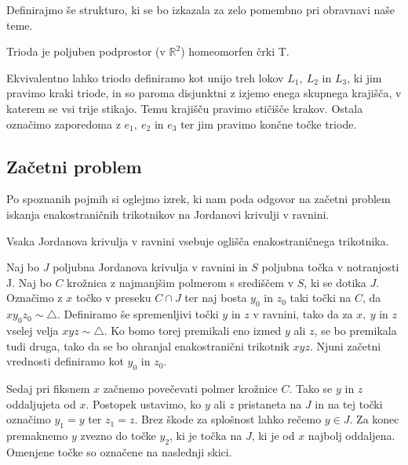 \documentclass[mat1]{fmfdelo}
\newcommand{\R}{\mathbb R}
\begin{document}
Definirajmo še strukturo, ki se bo izkazala za zelo pomembno pri obravnavi naše teme.
\begin{definicija}
Trioda je poljuben podprostor (v $\R^2$) homeomorfen črki T.
\end{definicija}
Ekvivalentno lahko triodo definiramo kot unijo treh lokov $L_1,\ L_2$ in $L_3$, ki jim pravimo kraki triode, in so paroma disjunktni z izjemo enega skupnega krajišča, v katerem se vsi trije stikajo. Temu krajišču pravimo stičišče krakov. Ostala označimo zaporedoma z $e_1,\ e_2$ in $e_3$ ter jim pravimo končne točke triode.


\subsection{Začetni problem}
Po spoznanih pojmih si oglejmo izrek, ki nam poda odgovor na začetni problem iskanja enakostraničnih trikotnikov na Jordanovi krivulji v ravnini.
\begin{izrek}\label{izr:zacetni}
Vsaka Jordanova krivulja v ravnini vsebuje oglišča enakostraničnega trikotnika.
\end{izrek}
\proof
Naj bo $J$ poljubna Jordanova krivulja v ravnini in $S$ poljubna točka v notranjosti J. Naj bo $C$ krožnica z najmanjšim polmerom s središčem v $S$, ki se dotika $J$. Označimo z $x$ točko v preseku $C \cap J$ ter naj bosta $y_0$ in $z_0$ taki točki na $C$, da $xy_0z_0 \sim \triangle$. Definiramo še spremenljivi točki $y$ in $z$ v ravnini, tako da za $x,\ y$ in $z$ vselej velja $xyz \sim \triangle$. Ko bomo torej premikali eno izmed $y$ ali $z$, se bo premikala tudi druga, tako da se bo ohranjal enakostranični trikotnik $xyz$. Njuni začetni vrednosti definiramo kot $y_0$ in $z_0$.

Sedaj pri fiksnem $x$ začnemo povečevati polmer krožnice $C$. Tako se $y$ in $z$ oddaljujeta od $x$. Postopek ustavimo, ko $y$ ali $z$ pristaneta na $J$ in na tej točki označimo $y_1 = y$ ter $z_1 = z$. Brez škode za splošnost lahko rečemo $y \in J$. Za konec premaknemo $y$ zvezno do točke $y_2$, ki je točka na $J$, ki je od $x$ najbolj oddaljena. Omenjene točke so označene na naslednji skici.

\begin{center}
\end{center}
\end{document}

